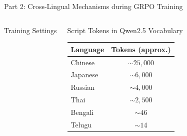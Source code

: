 \documentclass[aspectratio=169]{beamer}
\begin{document}
\begin{frame}{Part 2: Cross-Lingual Mechanisms during GRPO Training}
\begin{columns}
\begin{block}{\scriptsize Training Settings}
\begin{tabular}{ll}
					\bottomrule
				\end{tabular}
			\end{block}
			\begin{block}{\scriptsize Script Tokens in Qwen2.5 Vocabulary}\tiny
				\centering
				\renewcommand{\arraystretch}{1.1}
				\begin{tabular}{lc}
					\toprule
					Language & Tokens (approx.) \\
					\midrule
					Chinese  & $\sim 25{,}000$ \\
					Japanese & $\sim 6{,}000$ \\
					Russian  & $\sim 4{,}000$ \\
					Thai     & $\sim 2{,}500$ \\
					Bengali  & $\sim 46$ \\
					Telugu   & $\sim 14$ \\
					\bottomrule
				\end{tabular}
			\end{block}
		\end{columns}
	\end{frame}
	
\end{document}
